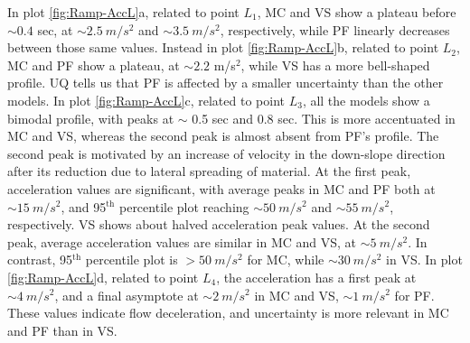 \documentclass{article}
\begin{document}
In plot \ref{fig:Ramp-AccL}a, related to point $L_1$, MC and VS show a plateau before $\sim 0.4$ sec, at $\sim 2.5 \ m/s^2$ and $\sim 3.5 \ m/s^2$, respectively, while PF linearly decreases between those same values. Instead in plot \ref{fig:Ramp-AccL}b, related to point $L_2$, MC and PF show a plateau, at $\sim 2.2$ m/s$^2$, while VS has a more bell-shaped profile. UQ tells us that PF is affected by a smaller uncertainty than the other models. In plot \ref{fig:Ramp-AccL}c, related to point $L_3$, all the models show a bimodal profile, with peaks at $\sim$ 0.5 sec and 0.8 sec. This is more accentuated in MC and VS, whereas the second peak is almost absent from PF's profile. The second peak is motivated by an increase of velocity in the down-slope direction after its reduction due to lateral spreading of material. At the first peak, acceleration values are significant, with average peaks in MC and PF both at $\sim 15 \ m/s^2$, and 95$^{\mathrm{th}}$ percentile plot reaching $\sim 50 \ m/s^2$ and $\sim 55 \ m/s^2$, respectively. VS shows about halved acceleration peak values. At the second peak, average acceleration values are similar in MC and VS, at $\sim 5 \ m/s^2$. In contrast, 95$^{\mathrm{th}}$ percentile plot is $> 50 \ m/s^2$ for MC, while $\sim 30 \ m/s^2$ in VS. In plot \ref{fig:Ramp-AccL}d, related to point $L_4$, the acceleration has a first peak at $\sim 4 \ m/s^2$, and a final asymptote at $\sim 2 \ m/s^2$ in MC and VS, $\sim 1 \ m/s^2$ for PF. These values indicate flow deceleration, and uncertainty is more relevant in MC and PF than in VS.
\end{document}
